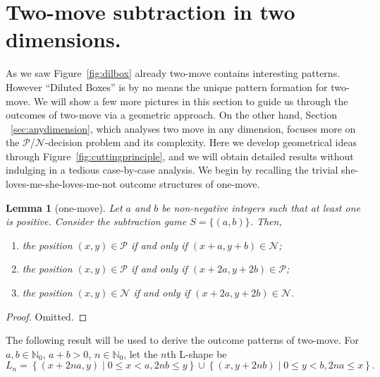 \documentclass{amsart}
\theoremstyle{plain}
\newtheorem{lem}[thm]{Lemma}
\theoremstyle{definition}
\newcommand{\N}{\ensuremath{\mathcal N}}
\renewcommand{\P}{\ensuremath{\mathcal P}}
\newcommand{\nz}{\mathbb N_0}
\renewcommand{\le}{\leqslant}
\begin{document}
\section{Two-move subtraction in two dimensions.}\label{sec:twomove}
As we saw  Figure~\ref{fig:dilbox}
already {\sc two-move} contains interesting patterns. However ``Diluted Boxes'' is by no means the unique pattern formation for {\sc two-move}. We will show a few more pictures in this section to guide us through the outcomes of {\sc two-move} via a geometric approach.  On the other hand, Section ~\ref{sec:anydimension}, which analyses {\sc two move} in any dimension,  focuses more on the \P/\N-decision problem and its complexity. Here we develop geometrical ideas through Figure~\ref{fig:cuttingprinciple}, and we will obtain detailed results without indulging in a tedious case-by-case analysis.
We begin by recalling the trivial she-loves-me-she-loves-me-not outcome structures of {\sc one-move}. 

\begin{lem}[{\sc one-move}]\label{lem:onemove}
 Let $a$ and $b$ be non-negative integers such that at least one is positive. Consider the subtraction game $S=\{(a,b)\}$. Then,
\begin{enumerate}
    \item [a)]  the position $(x,y)\in \P$ if and only if $(x+a, y+b)\in \N$;
  
    \item [b)]  the position $(x,y)\in \P$ if and only if $(x+2a, y+2b)\in \P$;
   
    \item [c)]  the position $(x,y)\in \N$ if and only if  $(x+2a, y+2b)\in \N$.
\end{enumerate}
\end{lem}

\begin{proof} 
Omitted. 
 \end{proof}


The following result will be used to derive the outcome patterns of  {\sc two-move}. For $a, b \in \nz $,  $a+b>0$, $n\in \nz $, let  the $n$th L-shape be $$L_n =   \left\{(x + 2na,y)\mid    0 \le x< a,  2nb\le y   \right\} \cup \left\{(x, y + 2nb)\mid    0 \le y< b , 2na\le x  \right\}. $$
\end{document}
